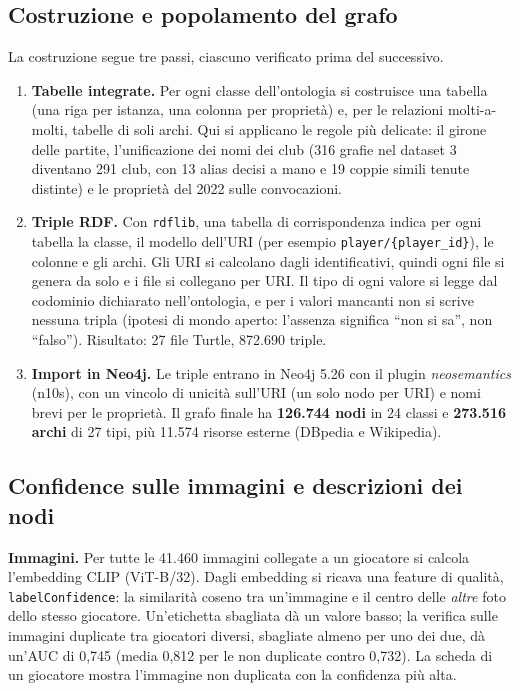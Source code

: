 \documentclass[11pt,a4paper]{article}
\newcommand{\code}[1]{\texttt{\small #1}}
\begin{document}
\subsection{Costruzione e popolamento del grafo}
La costruzione segue tre passi, ciascuno verificato prima del successivo.
\begin{enumerate}
  \item \textbf{Tabelle integrate.} Per ogni classe dell'ontologia si costruisce una tabella (una riga per istanza, una colonna per proprietà) e, per le relazioni molti-a-molti, tabelle di soli archi. Qui si applicano le regole più delicate: il girone delle partite, l'unificazione dei nomi dei club (316 grafie nel dataset 3 diventano 291 club, con 13 alias decisi a mano e 19 coppie simili tenute distinte) e le proprietà del 2022 sulle convocazioni.
  \item \textbf{Triple RDF.} Con \code{rdflib}, una tabella di corrispondenza indica per ogni tabella la classe, il modello dell'URI (per esempio \code{player/\{player\_id\}}), le colonne e gli archi. Gli URI si calcolano dagli identificativi, quindi ogni file si genera da solo e i file si collegano per URI. Il tipo di ogni valore si legge dal codominio dichiarato nell'ontologia, e per i valori mancanti non si scrive nessuna tripla (ipotesi di mondo aperto: l'assenza significa ``non si sa'', non ``falso''). Risultato: 27 file Turtle, 872.690 triple.
  \item \textbf{Import in Neo4j.} Le triple entrano in Neo4j 5.26 con il plugin \emph{neosemantics} (n10s), con un vincolo di unicità sull'URI (un solo nodo per URI) e nomi brevi per le proprietà. Il grafo finale ha \textbf{126.744 nodi} in 24 classi e \textbf{273.516 archi} di 27 tipi, più 11.574 risorse esterne (DBpedia e Wikipedia).
\end{enumerate}


\subsection{Confidence sulle immagini e descrizioni dei nodi}
\textbf{Immagini.} Per tutte le 41.460 immagini collegate a un giocatore si calcola l'embedding CLIP (ViT-B/32). Dagli embedding si ricava una feature di qualità, \code{labelConfidence}: la similarità coseno tra un'immagine e il centro delle \emph{altre} foto dello stesso giocatore. Un'etichetta sbagliata dà un valore basso; la verifica sulle immagini duplicate tra giocatori diversi, sbagliate almeno per uno dei due, dà un'AUC di 0,745 (media 0,812 per le non duplicate contro 0,732). La scheda di un giocatore mostra l'immagine non duplicata con la confidenza più alta.
\end{document}

